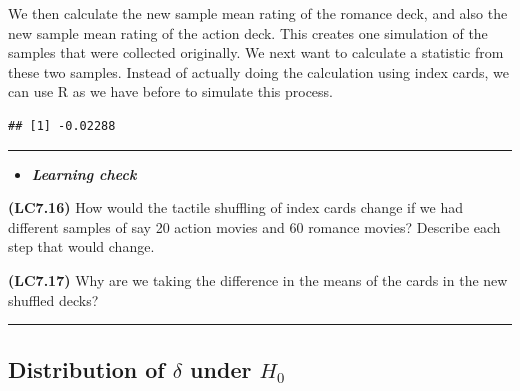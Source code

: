 \documentclass[]{tufte-book}
\newenvironment{Shaded}{\begin{snugshade}}{\end{snugshade}}
\newcommand{\KeywordTok}[1]{\textcolor[rgb]{0.13,0.29,0.53}{\textbf{{#1}}}}
\newcommand{\DataTypeTok}[1]{\textcolor[rgb]{0.13,0.29,0.53}{{#1}}}
\newcommand{\StringTok}[1]{\textcolor[rgb]{0.31,0.60,0.02}{{#1}}}
\newcommand{\NormalTok}[1]{{#1}}
\let\oldrule=\rule
\renewcommand{\rule}[1]{\oldrule{\linewidth}}
\newenvironment{rmdblock}[1]
  {\begin{shaded*}
  \begin{itemize}
  \renewcommand{\labelitemi}{
    \raisebox{-.7\height}[0pt][0pt]{
    }
  }
  \item
  }
  {
  \end{itemize}
  \end{shaded*}
  }
\newenvironment{learncheck}
  {\begin{rmdblock}{warning}}
  {\end{rmdblock}}
\begin{document}
We then calculate the new sample mean rating of the romance deck, and
also the new sample mean rating of the action deck. This creates one
simulation of the samples that were collected originally. We next want
to calculate a statistic from these two samples. Instead of actually
doing the calculation using index cards, we can use R as we have before
to simulate this process.

\begin{Shaded}
\end{Shaded}

\begin{verbatim}
## [1] -0.02288
\end{verbatim}

\begin{center}\rule{0.5\linewidth}{\linethickness}\end{center}

\begin{learncheck}
\textbf{\emph{Learning check}}
\end{learncheck}

\textbf{(LC7.16)} How would the tactile shuffling of index cards change
if we had different samples of say 20 action movies and 60 romance
movies? Describe each step that would change.

\textbf{(LC7.17)} Why are we taking the difference in the means of the
cards in the new shuffled decks?

\begin{center}\rule{0.5\linewidth}{\linethickness}\end{center}

\subsection{\texorpdfstring{Distribution of \(\delta\) under
\(H_0\)}{Distribution of \textbackslash{}delta under H\_0}}\label{distribution-of-delta-under-h_0-1}
\end{document}
